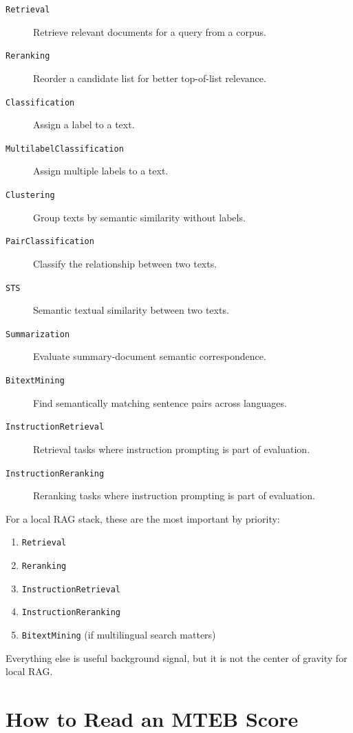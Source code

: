 \begin{description}
    \item[\texttt{Retrieval}] Retrieve relevant documents for a query from a corpus.
    \item[\texttt{Reranking}] Reorder a candidate list for better top-of-list relevance.
    \item[\texttt{Classification}] Assign a label to a text.
    \item[\texttt{MultilabelClassification}] Assign multiple labels to a text.
    \item[\texttt{Clustering}] Group texts by semantic similarity without labels.
    \item[\texttt{PairClassification}] Classify the relationship between two texts.
    \item[\texttt{STS}] Semantic textual similarity between two texts.
    \item[\texttt{Summarization}] Evaluate summary-document semantic correspondence.
    \item[\texttt{BitextMining}] Find semantically matching sentence pairs across languages.
    \item[\texttt{InstructionRetrieval}] Retrieval tasks where instruction prompting is part of evaluation.
    \item[\texttt{InstructionReranking}] Reranking tasks where instruction prompting is part of evaluation.
\end{description}

For a local RAG stack, these are the most important by priority:

\begin{enumerate}
    \item \texttt{Retrieval}
    \item \texttt{Reranking}
    \item \texttt{InstructionRetrieval}
    \item \texttt{InstructionReranking}
    \item \texttt{BitextMining} (if multilingual search matters)
\end{enumerate}

Everything else is useful background signal, but it is not the center of gravity for local RAG.

\section{How to Read an MTEB Score}

